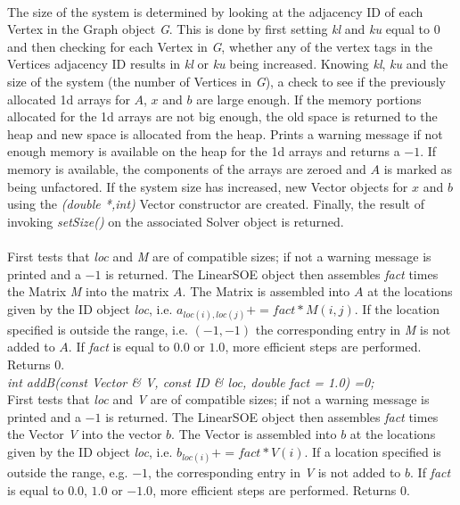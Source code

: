  \\ 
The size of the system is determined by looking at the adjacency ID of
each Vertex in the Graph object {\em G}. This is done by first setting
{\em kl} and {\em ku} equal to $0$ and then checking for each Vertex
in {\em G}, whether any of the vertex tags in the Vertices adjacency
ID results in {\em kl} or {\em ku} being increased. Knowing {\em kl},
{\em ku} and the size of the system (the number of Vertices in {\em G}),
a check to see if the previously allocated 1d arrays for $A$, $x$ and
$b$ are large enough. If the memory portions allocated for the 1d
arrays are not big enough, the old space is returned to the heap and
new space is allocated from the heap. Prints a warning message if
not enough memory is available on the heap for the 1d arrays and
returns a $-1$. If memory is available, the components of the arrays
are zeroed and $A$ is marked as being unfactored. If the system size
has increased, new Vector objects for $x$ and $b$ using the {\em (double
*,int)} Vector constructor are created. Finally, the result of
invoking {\em setSize()} on the associated Solver object is returned. \\


 \\
First tests that {\em loc} and {\em M} are of compatible sizes; if not
a warning message is printed and a $-1$ is returned. The LinearSOE
object then assembles {\em fact} times the Matrix {\em 
M} into the matrix $A$. The Matrix is assembled into $A$ at the
locations given by the ID object {\em loc}, i.e. $a_{loc(i),loc(j)} +=
fact * M(i,j)$. If the location specified is outside the range,
i.e. $(-1,-1)$ the corresponding entry in {\em M} is not added to
$A$. If {\em fact} is equal to $0.0$ or $1.0$, more efficient steps
are performed. Returns $0$.  \\


{\em int addB(const Vector \& V, const ID \& loc,
double fact = 1.0) =0;} \\
First tests that {\em loc} and {\em V} are of compatible sizes; if not
a warning message is printed and a $-1$ is returned. The LinearSOE
object then assembles {\em fact} times the Vector {\em V} into
the vector $b$. The Vector is assembled into $b$ at the locations
given by the ID object {\em loc}, i.e. $b_{loc(i)} += fact * V(i)$. If a
location specified is outside the range, e.g. $-1$, the corresponding
entry in {\em V} is not added to $b$. If {\em fact} is equal to $0.0$,
$1.0$ or $-1.0$, more efficient steps are performed. Returns $0$. \\

